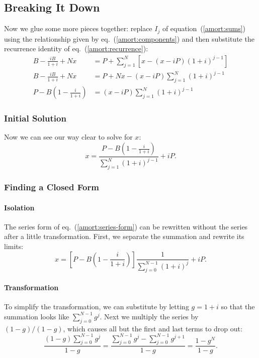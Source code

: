 
\subsection{Breaking It Down}
Now we glue some more pieces together: replace $I_j$ of
equation~(\ref{amort:sums}) using the relationship given by
eq.~(\ref{amort:components}) and then substitute the recurrence identity
of eq.~(\ref{amort:recurrence}):
\begin{align}
B - \frac{iB}{1+i} + Nx &{}= 
  P + \sum_{j=1}^N \left[x - (x - iP)(1 + i)^{j-1}\right] \nonumber \\
B - \frac{iB}{1+i} + Nx &{}= 
  P + Nx - (x - iP)\sum_{j=1}^N (1 + i)^{j-1} \nonumber \\
P - B\left(1 - \frac{i}{1+i}\right) &{}= (x - iP)\sum_{j=1}^N (1 + i)^{j-1}
\end{align}

\subsubsection{Initial Solution}
Now we can see our way clear to solve for $x$:
\begin{equation}
\label{amort:series-form}
x = \frac{P - B\left(1-\frac{i}{1+i}\right)}{\displaystyle\sum_{j=1}^{N} (1+i)^{j-1}} 
  + iP.
\end{equation}

\subsubsection{Finding a Closed Form}
\paragraph{Isolation} 
The series form of eq.~(\ref{amort:series-form}) can be rewritten
without the series after a little transformation.  First, we separate
the summation and rewrite its limits:
\begin{equation}
x = \left[P - B\left(1 - \frac{i}{1+i}\right)\right]
    \frac{1}{\displaystyle\sum_{j=0}^{N-1}(1+i)^j} + iP.
\end{equation}
\paragraph{Transformation}
To simplify the transformation, we can substitute by letting
$g = 1 + i$ so that the summation looks like $\sum_{j=0}^{N-1} g^j$.  
Next we multiply the series by $(1-g)/(1-g)$, which causes all
but the first and last terms to drop out:
\begin{equation}
\frac{(1-g)\displaystyle\sum_{j=0}^{N-1} g^j}{1-g}=
\frac{\displaystyle\sum_{j=0}^{N-1} g^j - \sum_{j=0}^{N-1} g^{j+1}}{1-g}
  = \frac{1 - g^N}{1-g}.
\end{equation}

